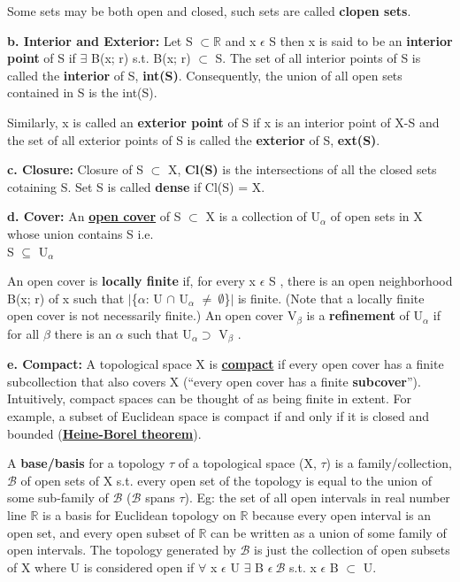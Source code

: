Some sets may be both open and closed, such sets are called \textbf{clopen sets}.

\textbf{b. Interior and Exterior: } Let S $\subset \mathbb{R}$ and x $\epsilon$ S then x is said to be an \textbf{interior point} of S if 
$\exists$ B(x; r) s.t. B(x; r) $\subset$ S. The set of all interior points of S is called the \textbf{interior} of S, \textbf{int(S)}.
Consequently, the union of all open sets contained in S is the int(S).

Similarly, x is called an \textbf{exterior point} of S if x is an interior point of X-S and the set of all exterior points of S
is called the \textbf{exterior} of S, \textbf{ext(S)}.

\textbf{c. Closure: } Closure of S $\subset$ X, \textbf{Cl(S)} is the intersections of all the closed sets cotaining S.
Set S is called \textbf{dense} if Cl(S) = X.

\textbf{d. Cover: } An \href{https://en.wikipedia.org/wiki/Cover_(topology)}{\textbf{open cover}} of S $\subset$ X is a collection of {U$_\alpha$} of open sets in X
whose union contains S i.e.\\
S $\subseteq$ U$_\alpha$

An open cover is \textbf{locally finite} if, for every x $\epsilon$ S , there is an open neighborhood B(x; r) of x
such that $\lvert$\{$\alpha$: U $\cap$ U$_\alpha$ $\neq \: \emptyset $\}$\rvert$ is finite. (Note that a locally finite open cover is not
necessarily finite.) An open cover {V$_\beta$ } is a \textbf{refinement} of {U$_\alpha$} if for all $\beta$ there is
an $\alpha$ such that U$_\alpha \supset$ V$_\beta$ .

\textbf{e. Compact: } A topological space X is \href{https://blogs.scientificamerican.com/roots-of-unity/what-does-compactness-really-mean/}{\textbf{compact}}
if every open cover has a finite subcollection that also covers X (“every open cover has a finite \textbf{subcover}”). 
Intuitively, compact spaces can be thought of as being finite in extent. 
For example, a subset of Euclidean space is compact if and only if it is closed and
bounded (\href{https://en.wikipedia.org/wiki/Heine%E2%80%93Borel_theorem}{\textbf{Heine-Borel theorem}}).

A \textbf{base/basis} for a topology $\tau$ of a topological space (X, $\tau$) is a family/collection, $\mathcal{B}$ of 
open sets of X s.t. every open set of the topology is equal to the union of some sub-family of $\mathcal{B}$ ($\mathcal{B}$ spans $\tau$).
Eg: the set of all open intervals in real number line $\mathbb{R}$ is a basis for Euclidean topology on $\mathbb{R}$ because every open
interval is an open set, and every open subset of $\mathbb{R}$ can be written as a union of some family of open intervals. The topology generated by $\mathcal{B}$ is just the collection of  open subsets of X where U is considered open
if $\forall$ x $\epsilon$ U $\exists$ B $\epsilon \: \mathcal{B}$ s.t. x $\epsilon$ B $\subset$ U.

